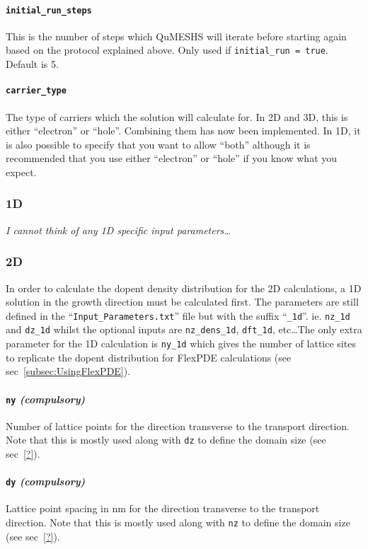 \documentclass[12pt]{article}
\newcommand{\red}[1]{{\color{red} \it #1}}
\begin{document}
\paragraph{\texttt{initial\_run\_steps}}
This is the number of steps which QuMESHS will iterate before starting again based on
the protocol explained above.  Only used if \texttt{initial\_run = true}.  Default is
5.

\paragraph{\texttt{carrier\_type}}
The type of carriers which the solution will calculate for.  In 2D and 3D, this is either
``electron'' or ``hole''.  Combining them has now been implemented.  In 1D, it is also possible
to specify that you want to allow ``both'' although it is recommended that you use either
``electron'' or ``hole'' if you know what you expect.


\subsubsection{1D}

\red{I cannot think of any 1D specific input parameters\ldots}


\subsubsection{2D}

In order to calculate the dopent density distribution for the 2D calculations, a 1D
solution in the growth direction must be calculated first.  The parameters are still
defined in the ``\texttt{Input\_Parameters.txt}'' file but with the suffix ``\texttt{\_1d}''.
ie. \texttt{nz\_1d} and \texttt{dz\_1d} whilst the optional inputs are \texttt{nz\_dens\_1d},
\texttt{dft\_1d}, etc\ldots  The only extra parameter for the 1D calculation is
\texttt{ny\_1d} which gives the number of lattice sites to replicate the dopent distribution
for FlexPDE calculations (see sec~\ref{subsec:UsingFlexPDE}).

\paragraph{\texttt{ny} \emph{(compulsory)}}
Number of lattice points for the direction transverse to the transport direction.  Note
that this is mostly used along with \texttt{dz} to define the domain size (see sec~\ref{?}).

\paragraph{\texttt{dy} \emph{(compulsory)}}
Lattice point spacing in nm for the direction transverse to the transport direction.
Note that this is mostly used along with \texttt{nz} to define the domain size (see
sec~\ref{?}).
\end{document}

